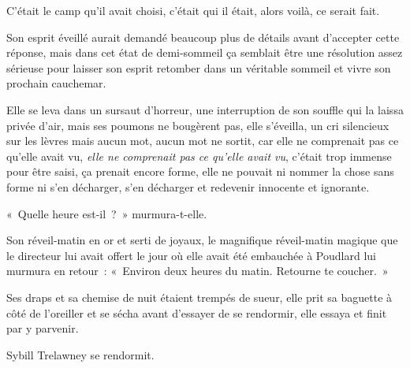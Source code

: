 C'était le camp qu'il avait choisi, c'était qui il était, alors voilà, ce serait fait.

Son esprit éveillé aurait demandé beaucoup plus de détails avant d'accepter cette réponse, mais dans cet état de demi-sommeil ça semblait être une résolution assez sérieuse pour laisser son esprit retomber dans un véritable sommeil et vivre son prochain cauchemar.


Elle se leva dans un sursaut d'horreur, une interruption de son souffle qui la laissa privée d'air, mais ses poumons ne bougèrent pas, elle s'éveilla, un cri silencieux sur les lèvres mais aucun mot, aucun mot ne sortit, car elle ne comprenait pas ce qu'elle avait vu, \emph{elle ne comprenait pas ce qu'elle avait vu}, c'était trop immense pour être saisi, ça prenait encore forme, elle ne pouvait ni nommer la chose sans forme ni s'en décharger, s'en décharger et redevenir innocente et ignorante.

«~Quelle heure est-il~?~» murmura-t-elle.

Son réveil-matin en or et serti de joyaux, le magnifique réveil-matin magique que le directeur lui avait offert le jour où elle avait été embauchée à Poudlard lui murmura en retour~: «~Environ deux heures du matin. Retourne te coucher.~»

Ses draps et sa chemise de nuit étaient trempés de sueur, elle prit sa baguette à côté de l'oreiller et se sécha avant d'essayer de se rendormir, elle essaya et finit par y parvenir.

Sybill Trelawney se rendormit.
